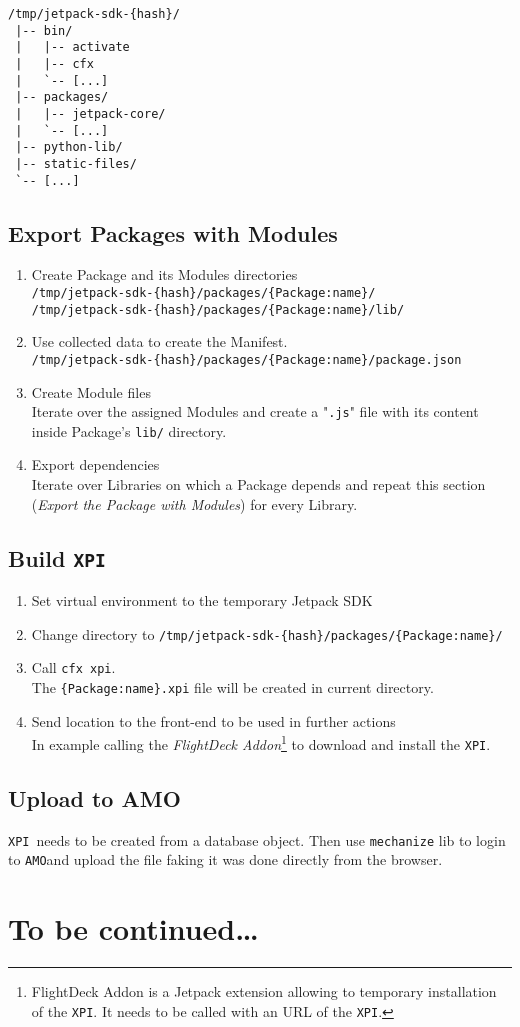 \documentclass[10pt]{article}
\def\xpi{{\tt XPI}}
\def\amo{{\tt AMO}}
\begin{document}
		\begin{lstlisting}[caption=Parts of the tree of a copied Jetpack SDK directory.]
 /tmp/jetpack-sdk-{hash}/
 |-- bin/
 |   |-- activate
 |   |-- cfx
 |   `-- [...]
 |-- packages/
 |   |-- jetpack-core/
 |   `-- [...]
 |-- python-lib/
 |-- static-files/
 `-- [...]
		\end{lstlisting}
	
		
	
	\subsection{Export Packages with Modules}
		
		\begin{enumerate}
			\item{Create Package and its Modules directories\\
				{\tt /tmp/jetpack-sdk-\{hash\}/packages/\{Package:name\}/}\\
				{\tt /tmp/jetpack-sdk-\{hash\}/packages/\{Package:name\}/lib/}
			}
			\item{Use collected data to create the Manifest.\\
				{\tt /tmp/jetpack-sdk-\{hash\}/packages/\{Package:name\}/package.json}
			}
			\item{Create Module files\\
				Iterate over the assigned Modules and create a "{\tt .js}" file with its content inside 
				Package's {\tt lib/} directory.
			}
			\item{Export dependencies\\
				Iterate over Libraries on which a Package depends and repeat this section ({\em Export 
				the Package with Modules}) for every Library.
			}
		\end{enumerate}
	
	\subsection{Build \xpi}
		\begin{enumerate}
			\item{Set virtual environment to the temporary Jetpack SDK}
			\item{Change directory to {\tt /tmp/jetpack-sdk-\{hash\}/packages/\{Package:name\}/}}
			\item{Call {\tt cfx xpi}.\\
				The {\tt \{Package:name\}.xpi} file will be created in current directory.} 
			\item{Send location to the front-end to be used in further actions\\
				In example calling the {\em FlightDeck Addon}\footnote{FlightDeck Addon is a Jetpack extension 
				allowing to temporary installation of the \xpi. It needs to be called with an URL of 
				the \xpi.} to download and install the \xpi.}
		\end{enumerate}
	
	\subsection{Upload to AMO}
	
		\xpi\ needs to be created from a database object. Then use {\tt mechanize} lib to login 
		to \amo and upload the file faking it was done directly from the browser.
							
\section*{To be continued\ldots}
\end{document}
